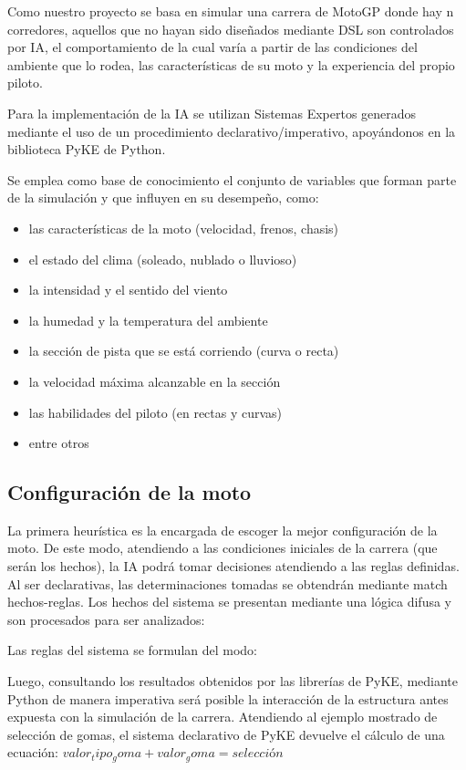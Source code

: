 Como nuestro proyecto se basa en simular una carrera de MotoGP donde hay n corredores, aquellos que no hayan sido diseñados mediante DSL son controlados por IA, el comportamiento de la cual varía a partir de las condiciones del ambiente que lo rodea, las características de su moto y la experiencia del propio piloto.

Para la implementación de la IA se utilizan Sistemas Expertos generados mediante el uso de un procedimiento declarativo/imperativo, apoyándonos en la biblioteca PyKE de Python.

Se emplea como base de conocimiento el conjunto de variables que forman parte de la simulación y que influyen en su desempeño, como:
\begin{itemize}
	\item las características de la moto (velocidad, frenos, chasis)
	\item el estado del clima (soleado, nublado o lluvioso)
	\item la intensidad y el sentido del viento
	\item la humedad y la temperatura del ambiente
	\item la sección de pista que se está corriendo (curva o recta)
	\item la velocidad máxima alcanzable en la sección
	\item las habilidades del piloto (en rectas y curvas)
	\item entre otros
\end{itemize}

\subsection{Configuración de la moto}
	La primera heurística es la encargada de escoger la mejor configuración de la moto. De este modo, atendiendo a las condiciones iniciales de la carrera (que serán los hechos), la IA podrá tomar decisiones atendiendo a las reglas definidas. Al ser declarativas, las determinaciones tomadas se obtendrán mediante match hechos-reglas.
	Los hechos del sistema se presentan mediante una lógica difusa y son procesados para ser analizados:

	Las reglas del sistema se formulan del modo:

	Luego, consultando los resultados obtenidos por las librerías de PyKE, mediante Python de manera imperativa será posible la interacción de la estructura antes expuesta con la simulación de la carrera.
	Atendiendo al ejemplo mostrado de selección de gomas, el sistema declarativo de PyKE devuelve el cálculo de una ecuación:
	$valor_tipo_goma + valor_goma = selección$

